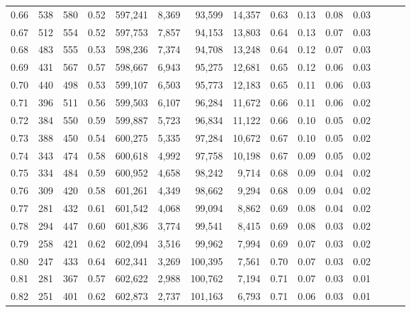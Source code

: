 \begin{tabular}{rrrrrrrrrrrrrrr}
0.66 &     538 &    580 &  0.52 &  597,241 &    8,369 &   93,599 &   14,357 &  0.63 &  0.13 &  0.08 &      0.03 \\
0.67 &     512 &    554 &  0.52 &  597,753 &    7,857 &   94,153 &   13,803 &  0.64 &  0.13 &  0.07 &      0.03 \\
0.68 &     483 &    555 &  0.53 &  598,236 &    7,374 &   94,708 &   13,248 &  0.64 &  0.12 &  0.07 &      0.03 \\
0.69 &     431 &    567 &  0.57 &  598,667 &    6,943 &   95,275 &   12,681 &  0.65 &  0.12 &  0.06 &      0.03 \\
0.70 &     440 &    498 &  0.53 &  599,107 &    6,503 &   95,773 &   12,183 &  0.65 &  0.11 &  0.06 &      0.03 \\
0.71 &     396 &    511 &  0.56 &  599,503 &    6,107 &   96,284 &   11,672 &  0.66 &  0.11 &  0.06 &      0.02 \\
0.72 &     384 &    550 &  0.59 &  599,887 &    5,723 &   96,834 &   11,122 &  0.66 &  0.10 &  0.05 &      0.02 \\
0.73 &     388 &    450 &  0.54 &  600,275 &    5,335 &   97,284 &   10,672 &  0.67 &  0.10 &  0.05 &      0.02 \\
0.74 &     343 &    474 &  0.58 &  600,618 &    4,992 &   97,758 &   10,198 &  0.67 &  0.09 &  0.05 &      0.02 \\
0.75 &     334 &    484 &  0.59 &  600,952 &    4,658 &   98,242 &    9,714 &  0.68 &  0.09 &  0.04 &      0.02 \\
0.76 &     309 &    420 &  0.58 &  601,261 &    4,349 &   98,662 &    9,294 &  0.68 &  0.09 &  0.04 &      0.02 \\
0.77 &     281 &    432 &  0.61 &  601,542 &    4,068 &   99,094 &    8,862 &  0.69 &  0.08 &  0.04 &      0.02 \\
0.78 &     294 &    447 &  0.60 &  601,836 &    3,774 &   99,541 &    8,415 &  0.69 &  0.08 &  0.03 &      0.02 \\
0.79 &     258 &    421 &  0.62 &  602,094 &    3,516 &   99,962 &    7,994 &  0.69 &  0.07 &  0.03 &      0.02 \\
0.80 &     247 &    433 &  0.64 &  602,341 &    3,269 &  100,395 &    7,561 &  0.70 &  0.07 &  0.03 &      0.02 \\
0.81 &     281 &    367 &  0.57 &  602,622 &    2,988 &  100,762 &    7,194 &  0.71 &  0.07 &  0.03 &      0.01 \\
0.82 &     251 &    401 &  0.62 &  602,873 &    2,737 &  101,163 &    6,793 &  0.71 &  0.06 &  0.03 &      0.01 \\

\end{tabular}
